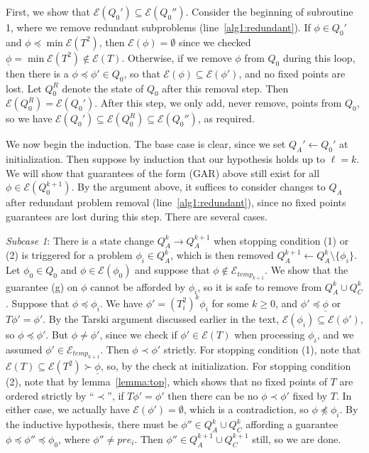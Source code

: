 \documentclass[11pt,reqno]{amsart}
\theoremstyle{definition}
\numberwithin{equation}{section}
\newcommand{\ul}{\underline}
\newcommand{\pre}{\phi}
\newcommand{\sub}{\subseteq}
\newcommand{\fix}{\mathcal{E}}
\newcommand{\peq}{\preceq}
\newcommand{\pe}{\prec}
\newcommand{\bopre}{\ul{\pre}}
\newcommand{\acto}{Q_0}
\newcommand{\actokk}{Q_0^{k+1}}
\newcommand{\actak}{Q_A^k}
\newcommand{\acta}{Q_A}
\newcommand{\actak}{Q_A^{k}}
\newcommand{\actakk}{Q_A^{k + 1}}
\newcommand{\actck}{Q_C^k}
\newcommand{\actckk}{Q_C^{k + 1}}
\newcommand{\pren}{\pre_{0}}
\newcommand{\fixtemp}{\mathcal{E}_{temp}}
\begin{document}
\begin{enumerate}
First, we show that $\fix(\acto') \sub \fix(\acto'')$. 
Consider the beginning of subroutine 1, where we remove redundant subproblems (line~\ref{alg1:redundant}).
If $\pre \in \acto'$ and $\pre \peq \min \fix(T^2)$, then $\fix(\pre) = \emptyset$ since we checked $\bopre = \min \fix(T^2) \not \in \fix(T)$. 
Otherwise, if we remove $\pre$ from $\acto$ during this loop, then there is a $\pre \peq \pre' \in \acto$, so that $\fix(\pre) \sub \fix(\pre')$, and no fixed points are lost.
Let $\acto^R$ denote the state of $\acto$ after this removal step.
Then $\fix(\acto^R) = \fix(\acto')$.
After this step, we only add, never remove, points from $\acto$, so we have $\fix(\acto') \sub \fix(\acto^R) \sub \fix(\acto'')$, as required.

We now begin the induction.
The base case is clear, since we set $\acta' \leftarrow \acto'$ at initialization.
Then suppose by induction that our hypothesis holds up to $\ell = k$.
We will show that guarantees of the form (GAR) above still exist for all $\pre \in \fix(\actokk)$.
By the argument above, it suffices to consider changes to $\acta$ after redundant problem removal (line~\ref{alg1:redundant}), since no fixed points guarantees are lost during this step.
There are several cases.

\emph{Subcase 1}: There is a state change $\actak \to \actakk$ when stopping condition (1) or (2) is triggered for a problem $\pre_i \in \actak$, which is then removed $\actakk \leftarrow \actak \setminus \{\pre_i\}$.
Let $\pren \in \acto$ and $\pre \in \fix(\pren)$ and suppose that $\pre \not \in \fixtemp_{k + 1}$.
We show that the guarantee (g) on $\pre$ cannot be afforded by $\pre_i$, so it is safe to remove from $\actak \cup \actck$.
Suppose that $\pre \peq \pre_i$.
We have $\pre' = (T_i^2)^k \pre_i$ for some $k \geq 0$, and $\pre' \peq \bopre$ or $T \pre' = \pre'$.
By the Tarski argument discussed earlier in the text, $\fix(\pre_i) \sub \fix(\pre')$, so $\pre \peq \pre'$.
But $\pre \not = \pre'$, since we check if $\pre' \in \fix(T)$ when processing $\pre_i$, and we assumed $\pre' \in \fixtemp_{k + 1}$.
Then $\pre \pe \pre'$ strictly.
For stopping condition (1), note that $\fix(T) \sub \fix(T^2) \succ \bopre$, so, by the check at initialization. 
For stopping condition (2), note that by lemma~\ref{lemma:top}, which shows that no fixed points of $T$ are ordered strictly by ``$\pe$'', if $T\pre' = \pre'$ then there can be no $\pre \pe \pre'$ fixed by $T$. 
In either case, we actually have $\fix(\pre') = \emptyset$, which is a contradiction, so $\pre \not \peq \pre_i$.
By the inductive hypothesis, there must be $\pre'' \in \actak \cup \actck$ affording a guarantee $\pre \peq \pre'' \peq \pren$, where $\pre'' \not = pre_i$.
Then $\pre'' \in \actakk \cup \actckk$ still, so we are done.


\end{enumerate}
\end{document}
